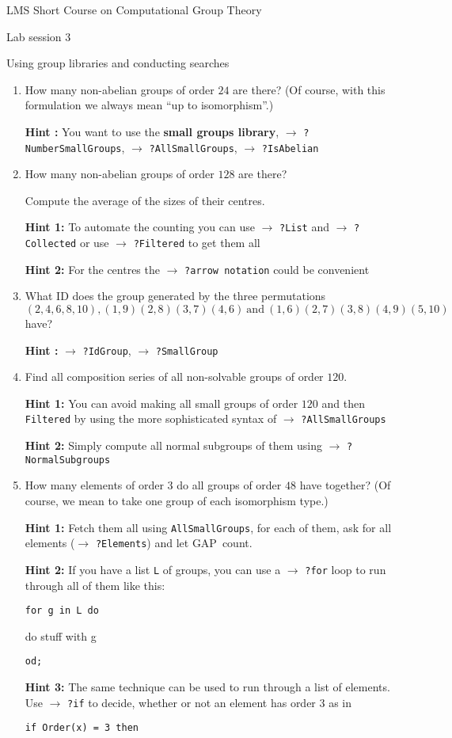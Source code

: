 \documentclass[12pt]{article}
\newcommand{\GAP}{\textsf{GAP}}
\newcommand{\hint}[1]{\par\textbf{Hint #1:}}
\newcommand{\see}[1]{$\to$ \texttt{?#1}}
\begin{document}
\begin{center}
\large LMS Short Course on Computational Group Theory

\Large Lab session 3

\large Using group libraries and conducting searches
\end{center}

\begin{enumerate}
\setlength{\parskip}{0pt}
\item How many non-abelian groups of order $24$ are there? (Of course, with
this formulation we always mean ``up to isomorphism''.)
\hint{} You want to use the \textbf{small groups library},
\see{NumberSmallGroups}, \see{AllSmallGroups}, \see{IsAbelian}
\item How many non-abelian groups of order $128$ are there?

Compute the average of the sizes of their centres.
\hint{1} To automate the counting you can use \see{List} and
\see{Collected} or use \see{Filtered} to get them all
\hint{2} For the centres the \see{arrow notation} could be convenient
\item What ID does the group generated by the three permutations
\[ (2,4,6,8,10), (1,9)(2,8)(3,7)(4,6)\ \mbox{and}\ 
(1,6)(2,7)(3,8)(4,9)(5,10) \]
have?
\hint{} \see{IdGroup}, \see{SmallGroup}
\item Find all composition series of all non-solvable groups of order $120$.
\hint{1} You can avoid making all small groups of order $120$ and 
then \texttt{Filtered} by using the more sophisticated
syntax of \see{AllSmallGroups}
\hint{2} Simply compute all normal subgroups of them using
\see{NormalSubgroups}
\item How many elements of order $3$ do all groups of order $48$ have
together? (Of course, we mean to take one group of each isomorphism
type.)
\hint{1} Fetch them all using \texttt{AllSmallGroups}, for each of them,
ask for all elements (\see{Elements}) and let \GAP\ count.
\hint{2} If you have a list \texttt{L} of groups, you can use a \see{for} loop
to run through all of them like this:

\texttt{for g in L do}

\hspace*{1cm} do stuff with g

\texttt{od;}
\hint{3} The same technique can be used to run through a list of elements.
Use \see{if} to decide, whether or not an element has order $3$ as in

\texttt{if Order(x) = 3 then}


\end{enumerate}
\end{document}
